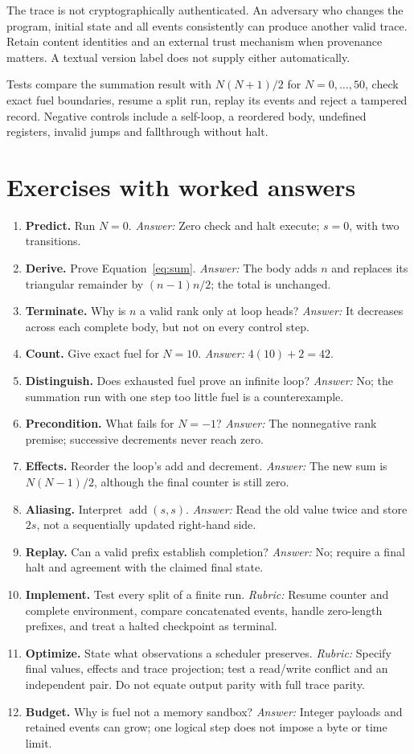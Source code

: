 The trace is not cryptographically authenticated. An adversary who changes
the program, initial state and all events consistently can produce another valid
trace. Retain content identities and an external trust mechanism when provenance
matters. A textual version label does not supply either automatically.

Tests compare the summation result with $N(N+1)/2$ for $N=0,\ldots,50$,
check exact fuel boundaries, resume a split run, replay its events and reject
a tampered record. Negative controls include a self-loop, a reordered body,
undefined registers, invalid jumps and fallthrough without halt.

\section{Exercises with worked answers}
\begin{enumerate}
\item \textbf{Predict.} Run $N=0$. \emph{Answer:} Zero check and halt execute;
$s=0$, with two transitions.
\item \textbf{Derive.} Prove Equation~\ref{eq:sum}. \emph{Answer:} The body adds $n$
and replaces its triangular remainder by $(n-1)n/2$; the total is unchanged.
\item \textbf{Terminate.} Why is $n$ a valid rank only at loop heads?
\emph{Answer:} It decreases across each complete body, but not on every control step.
\item \textbf{Count.} Give exact fuel for $N=10$. \emph{Answer:} $4(10)+2=42$.
\item \textbf{Distinguish.} Does exhausted fuel prove an infinite loop?
\emph{Answer:} No; the summation run with one step too little fuel is a counterexample.
\item \textbf{Precondition.} What fails for $N=-1$?
\emph{Answer:} The nonnegative rank premise; successive decrements never reach zero.
\item \textbf{Effects.} Reorder the loop's add and decrement.
\emph{Answer:} The new sum is $N(N-1)/2$, although the final counter is still zero.
\item \textbf{Aliasing.} Interpret $\operatorname{add}(s,s)$.
\emph{Answer:} Read the old value twice and store $2s$, not a sequentially updated
right-hand side.
\item \textbf{Replay.} Can a valid prefix establish completion?
\emph{Answer:} No; require a final halt and agreement with the claimed final state.
\item \textbf{Implement.} Test every split of a finite run.
\emph{Rubric:} Resume counter and complete environment, compare concatenated events,
handle zero-length prefixes, and treat a halted checkpoint as terminal.
\item \textbf{Optimize.} State what observations a scheduler preserves.
\emph{Rubric:} Specify final values, effects and trace projection; test a read/write
conflict and an independent pair. Do not equate output parity with full trace parity.
\item \textbf{Budget.} Why is fuel not a memory sandbox?
\emph{Answer:} Integer payloads and retained events can grow; one logical step
does not impose a byte or time limit.
\end{enumerate}
